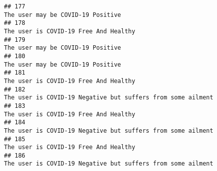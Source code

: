 \documentclass[
]{article}
\begin{document}
\begin{verbatim}
## 177                                                                                                                                                                                                                                  The user may be COVID-19 Positive
## 178                                                                                                                                                                                                                              The user is COVID-19 Free And Healthy
## 179                                                                                                                                                                                                                                  The user may be COVID-19 Positive
## 180                                                                                                                                                                                                                                  The user may be COVID-19 Positive
## 181                                                                                                                                                                                                                              The user is COVID-19 Free And Healthy
## 182                                                                                                                                                                                                        The user is COVID-19 Negative but suffers from some ailment
## 183                                                                                                                                                                                                                              The user is COVID-19 Free And Healthy
## 184                                                                                                                                                                                                        The user is COVID-19 Negative but suffers from some ailment
## 185                                                                                                                                                                                                                              The user is COVID-19 Free And Healthy
## 186                                                                                                                                                                                                        The user is COVID-19 Negative but suffers from some ailment

\end{verbatim}
\end{document}
